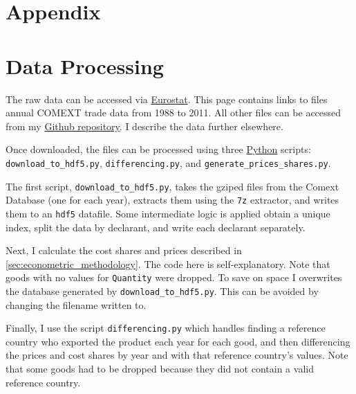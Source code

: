 \documentclass[12pt,a4paper]{article}                      %
\begin{document}



\newpage

\section{Appendix}
\label{sec:appendix}





\section{Data Processing}
\label{sec:data_processing}

The raw data can be accessed via \href{http://epp.eurostat.ec.europa.eu/NavTree\_prod/everybody/BulkDownloadListing?sort=1\&dir=comext%2F2012S2%2Fdata}{Eurostat}.  This page contains links to files annual COMEXT trade data from 1988 to 2011.
All other files can be accessed from my \href{https://github.com/TomAugspurger/data-wrangling/tree/master/new_start}{Github repository}.
I describe the data further elsewhere.


Once downloaded, the files can be processed using three \href{www.python.org}{Python} scripts: \texttt{download\_to\_hdf5.py}, \texttt{differencing.py}, and \texttt{generate\_prices\_shares.py}.

 
The first script, \texttt{download\_to\_hdf5.py}, takes the gziped files from the Comext Database (one for each year), extracts them using the \texttt{7z} extractor, and writes them to an \texttt{hdf5} datafile.  Some intermediate logic is applied obtain a unique index, split the data by declarant, and write each declarant separately.


Next, I calculate the cost shares and prices described in \ref{sec:econometric_methodology}.  The code here is self-explanatory. Note that goods with no values for \texttt{Quantity} were dropped. To save on space I overwrites the database generated by \texttt{download\_to\_hdf5.py}.  This can be avoided by changing the filename written to.


Finally, I use the script \texttt{differencing.py} which handles finding a reference country who exported the product each year for each good, and then differencing the prices and cost shares by year and with that reference country's values.  Note that some goods had to be dropped because they did not contain a valid reference country.
\end{document}
